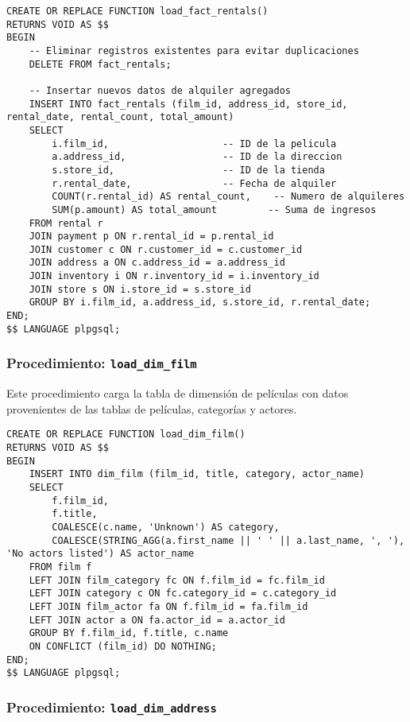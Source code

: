 \documentclass{article}
\begin{document}
\begin{lstlisting}
CREATE OR REPLACE FUNCTION load_fact_rentals()
RETURNS VOID AS $$
BEGIN
    -- Eliminar registros existentes para evitar duplicaciones
    DELETE FROM fact_rentals;

    -- Insertar nuevos datos de alquiler agregados
    INSERT INTO fact_rentals (film_id, address_id, store_id, rental_date, rental_count, total_amount)
    SELECT 
        i.film_id,                    -- ID de la pelicula
        a.address_id,                 -- ID de la direccion
        s.store_id,                   -- ID de la tienda
        r.rental_date,                -- Fecha de alquiler
        COUNT(r.rental_id) AS rental_count,    -- Numero de alquileres
        SUM(p.amount) AS total_amount         -- Suma de ingresos
    FROM rental r
    JOIN payment p ON r.rental_id = p.rental_id
    JOIN customer c ON r.customer_id = c.customer_id
    JOIN address a ON c.address_id = a.address_id
    JOIN inventory i ON r.inventory_id = i.inventory_id
    JOIN store s ON i.store_id = s.store_id
    GROUP BY i.film_id, a.address_id, s.store_id, r.rental_date;
END;
$$ LANGUAGE plpgsql;
\end{lstlisting}

\subsubsection{Procedimiento: \texttt{load\_dim\_film}}

Este procedimiento carga la tabla de dimensión de películas con datos provenientes de las tablas de películas, categorías y actores.

\begin{lstlisting}
CREATE OR REPLACE FUNCTION load_dim_film()
RETURNS VOID AS $$
BEGIN
    INSERT INTO dim_film (film_id, title, category, actor_name)
    SELECT 
        f.film_id,                                
        f.title,                                  
        COALESCE(c.name, 'Unknown') AS category,  
        COALESCE(STRING_AGG(a.first_name || ' ' || a.last_name, ', '), 'No actors listed') AS actor_name
    FROM film f
    LEFT JOIN film_category fc ON f.film_id = fc.film_id
    LEFT JOIN category c ON fc.category_id = c.category_id
    LEFT JOIN film_actor fa ON f.film_id = fa.film_id
    LEFT JOIN actor a ON fa.actor_id = a.actor_id
    GROUP BY f.film_id, f.title, c.name
    ON CONFLICT (film_id) DO NOTHING;
END;
$$ LANGUAGE plpgsql;
\end{lstlisting}

\subsubsection{Procedimiento: \texttt{load\_dim\_address}}
\end{document}
